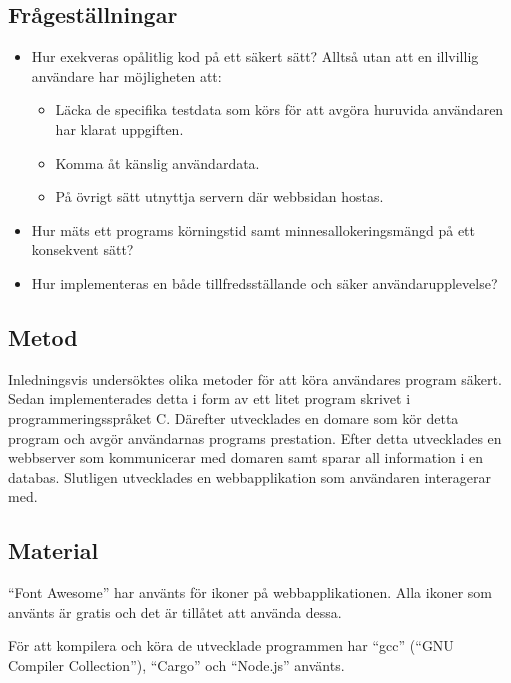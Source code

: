 \documentclass{article}
\begin{document}
\subsection{Frågeställningar}

\begin{itemize}
	\item Hur exekveras opålitlig kod på ett säkert sätt? Alltså utan att en
		illvillig användare har möjligheten att:
		\begin{itemize}
			\item Läcka de specifika testdata som körs för att avgöra huruvida
				användaren har klarat uppgiften.
			\item Komma åt känslig användardata.
			\item På övrigt sätt utnyttja servern där webbsidan hostas.
		\end{itemize}
	\item
		Hur mäts ett programs körningstid samt minnesallokeringsmängd på ett
		konsekvent sätt?
	\item
		Hur implementeras en både tillfredsställande och säker
		användarupplevelse?

\end{itemize}

\subsection{Metod}

Inledningsvis undersöktes olika metoder för att köra användares program säkert.
Sedan implementerades detta i form av ett litet program skrivet i
programmeringsspråket C. Därefter utvecklades en domare som kör detta program
och avgör användarnas programs prestation. Efter detta utvecklades en webbserver
som kommunicerar med domaren samt sparar all information i en databas. Slutligen
utvecklades en webbapplikation som användaren interagerar med.

\subsection{Material}

``Font Awesome'' har använts för ikoner på webbapplikationen. Alla ikoner som
använts är gratis och det är tillåtet att använda dessa.

För att kompilera och köra de utvecklade programmen har ``gcc'' (``GNU Compiler
Collection''), ``Cargo'' och ``Node.js'' använts.
\end{document}
